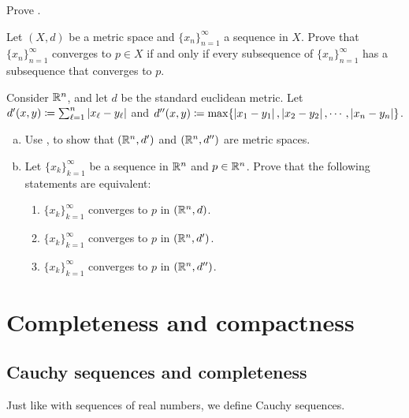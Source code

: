 \begin{exercise}
Prove .
\end{exercise}

\begin{exercise}
Let $(X,d)$ be a metric space and $\{ x_n \}_{n=1}^\infty$ a sequence in $X$.
Prove that $\{ x_n \}_{n=1}^\infty$ converges to $p \in X$
if and only if
every subsequence of $\{ x_n \}_{n=1}^\infty$ has a subsequence that
converges to $p$.
\end{exercise}

\begin{exercise}
Consider ${\mathbb{R}}^n$, and let $d$ be the standard euclidean metric.
Let $d'(x,y) \coloneqq \sum_{\ell=1}^n \left\lvert {x_\ell-y_\ell} \right\rvert$ and
$d''(x,y) \coloneqq \max \{ \left\lvert {x_1-y_1} \right\rvert,\left\lvert {x_2-y_2} \right\rvert,\cdots,\left\lvert {x_n-y_n} \right\rvert \}$.
\begin{enumerate}[a)]
\item
Use , to show that
$({\mathbb{R}}^n,d')$ and
$({\mathbb{R}}^n,d'')$ are metric spaces.
\item
Let $\{ x_k \}_{k=1}^\infty$ be a sequence in ${\mathbb{R}}^n$ and $p \in {\mathbb{R}}^n$.
Prove that the following statements are equivalent:
\begin{enumerate}[(1)]
\item
$\{ x_k \}_{k=1}^\infty$ converges to $p$ in $({\mathbb{R}}^n,d)$.
\item
$\{ x_k \}_{k=1}^\infty$ converges to $p$ in $({\mathbb{R}}^n,d')$.
\item
$\{ x_k \}_{k=1}^\infty$ converges to $p$ in $({\mathbb{R}}^n,d'')$.
\end{enumerate}
\end{enumerate}
\end{exercise}


\sectionnewpage
\section{Completeness and compactness}
\label{sec:metcompact}


\subsection{Cauchy sequences and completeness}

Just like with sequences of real numbers, we define Cauchy sequences.

